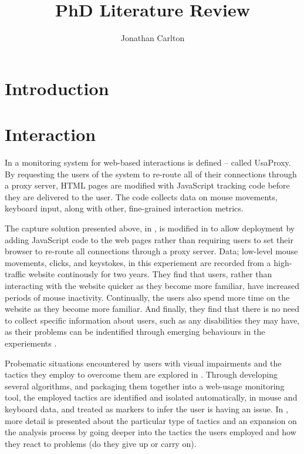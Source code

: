 \documentclass{llncs2e/llncs}
\title{PhD Literature Review}
\author{Jonathan Carlton}
\institute{School of Computer Science \\ University of Manchester \\
\email{jonathan.carlton@postgrad.manchester.ac.uk}
}
\begin{document}
  \maketitle

  \section{Introduction}

  \section{Interaction}
  In \cite{atterer2006knowing} a monitoring system for web-based interactions is
  defined -- called UsaProxy. By requesting the users of the system to re-route
  all of their connections through a proxy server, HTML pages are modified with
  JavaScript tracking code before they are delivered to the user. The code
  collects data on mouse movements, keyboard input, along with other,
  fine-grained interaction metrics.

  The capture solution presented above, in \cite{atterer2006knowing}, is
  modified in \cite{apaolaza2015longitudinal} to allow deployment by adding
  JavaScript code to the web pages rather than requiring users to set their
  browser to re-route all connections through a proxy server. Data; low-level
  mouse movements, clicks, and keystokes, in this experiement are recorded from
  a high-traffic website continously for two years. They find that users, rather
  than interacting with the website quicker as they become more familiar, have
  increased periods of mouse inactivity. Continually, the users also spend
  more time on the website as they become more familiar. And finally, they
  find that there is no need to collect specific information about users, such
  as any disabilities they may have, as their problems can be indentified through
  emerging behaviours in the experiements \cite{apaolaza2013understanding}.

  Probematic situations encountered by users with visual impairments and the tactics
  they employ to overcome them are explored in \cite{vigo2013evaluating}. Through
  developing several algorithms, and packaging them together into a web-usage
  monitoring tool, the employed tactics are identified and isolated automatically,
  in mouse and keyboard data, and treated as markers to infer the user is having
  an issue. In \cite{vigo2013coping}, more detail is presented about the particular
  type of tactics and an expansion on the analysis process by going deeper into
  the tactics the users employed and how they react to problems (do they give up
  or carry on).
\end{document}
